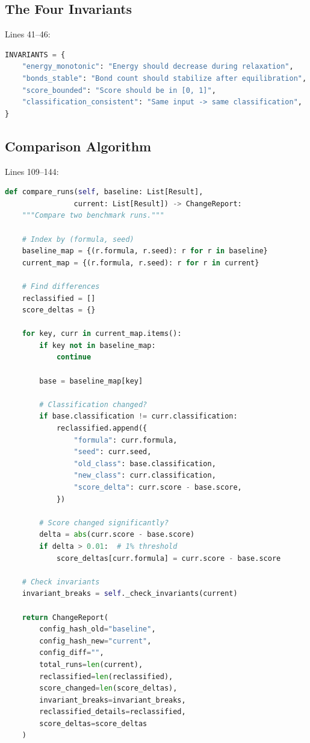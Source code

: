 \documentclass[11pt]{article}
\begin{document}
\subsection{The Four Invariants}

Lines 41--46:

\begin{lstlisting}[language=Python]
INVARIANTS = {
    "energy_monotonic": "Energy should decrease during relaxation",
    "bonds_stable": "Bond count should stabilize after equilibration",
    "score_bounded": "Score should be in [0, 1]",
    "classification_consistent": "Same input -> same classification",
}
\end{lstlisting}

\subsection{Comparison Algorithm}

Lines 109--144:

\begin{lstlisting}[language=Python]
def compare_runs(self, baseline: List[Result], 
                current: List[Result]) -> ChangeReport:
    """Compare two benchmark runs."""
    
    # Index by (formula, seed)
    baseline_map = {(r.formula, r.seed): r for r in baseline}
    current_map = {(r.formula, r.seed): r for r in current}
    
    # Find differences
    reclassified = []
    score_deltas = {}
    
    for key, curr in current_map.items():
        if key not in baseline_map:
            continue
        
        base = baseline_map[key]
        
        # Classification changed?
        if base.classification != curr.classification:
            reclassified.append({
                "formula": curr.formula,
                "seed": curr.seed,
                "old_class": base.classification,
                "new_class": curr.classification,
                "score_delta": curr.score - base.score,
            })
        
        # Score changed significantly?
        delta = abs(curr.score - base.score)
        if delta > 0.01:  # 1% threshold
            score_deltas[curr.formula] = curr.score - base.score
    
    # Check invariants
    invariant_breaks = self._check_invariants(current)
    
    return ChangeReport(
        config_hash_old="baseline",
        config_hash_new="current",
        config_diff="",
        total_runs=len(current),
        reclassified=len(reclassified),
        score_changed=len(score_deltas),
        invariant_breaks=invariant_breaks,
        reclassified_details=reclassified,
        score_deltas=score_deltas
    )
\end{lstlisting}
\end{document}
